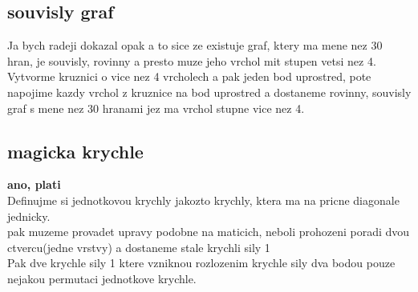 \documentclass[a4paper]{article}
\begin{document}
\subsection{souvisly graf}
Ja bych radeji dokazal opak a to sice ze existuje graf, ktery ma mene nez 30 hran, je souvisly, 
rovinny a presto muze jeho vrchol mit stupen vetsi nez 4.\\
Vytvorme kruznici o vice nez 4 vrcholech a pak jeden bod uprostred, pote napojime kazdy vrchol z kruznice na bod uprostred a dostaneme rovinny, souvisly graf s mene nez 30 hranami  jez ma vrchol stupne vice nez 4.

\subsection{magicka krychle}
\textbf{ano, plati}\\
Definujme si jednotkovou krychly jakozto krychly, ktera ma na pricne diagonale jednicky.\\
pak muzeme provadet upravy podobne na maticich, neboli prohozeni poradi dvou ctvercu(jedne vrstvy) a dostaneme stale krychli sily 1\\
Pak dve krychle sily 1 ktere vzniknou rozlozenim krychle sily dva bodou pouze nejakou permutaci jednotkove krychle.
\end{document}
